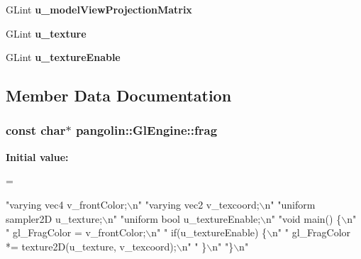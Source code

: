 \begin{DoxyCompactItemize}
\item 
G\+Lint {\bfseries u\+\_\+model\+View\+Projection\+Matrix}\hypertarget{classpangolin_1_1_gl_engine_ad2fc4ebbdb669ef755d7f9466776caaf}{}\label{classpangolin_1_1_gl_engine_ad2fc4ebbdb669ef755d7f9466776caaf}

\item 
G\+Lint {\bfseries u\+\_\+texture}\hypertarget{classpangolin_1_1_gl_engine_a93197b50d98df00bcee1acb99965b91a}{}\label{classpangolin_1_1_gl_engine_a93197b50d98df00bcee1acb99965b91a}

\item 
G\+Lint {\bfseries u\+\_\+texture\+Enable}\hypertarget{classpangolin_1_1_gl_engine_a00bc41a89fc34752eeed98e5ab12e071}{}\label{classpangolin_1_1_gl_engine_a00bc41a89fc34752eeed98e5ab12e071}

\end{DoxyCompactItemize}


\subsection{Member Data Documentation}
\subsubsection[{\texorpdfstring{frag}{frag}}]{\setlength{\rightskip}{0pt plus 5cm}const char$\ast$ pangolin\+::\+Gl\+Engine\+::frag}\hypertarget{classpangolin_1_1_gl_engine_a31a7ddec551f97901b4c2e32ea1b8c41}{}\label{classpangolin_1_1_gl_engine_a31a7ddec551f97901b4c2e32ea1b8c41}
{\bfseries Initial value\+:}
\begin{DoxyCode}
=


 
            \textcolor{stringliteral}{"varying vec4 v\_frontColor;\(\backslash\)n"}
            \textcolor{stringliteral}{"varying vec2 v\_texcoord;\(\backslash\)n"}
            \textcolor{stringliteral}{"uniform sampler2D u\_texture;\(\backslash\)n"}
            \textcolor{stringliteral}{"uniform bool u\_textureEnable;\(\backslash\)n"}
            \textcolor{stringliteral}{"void main() \{\(\backslash\)n"}
            \textcolor{stringliteral}{"  gl\_FragColor = v\_frontColor;\(\backslash\)n"}
            \textcolor{stringliteral}{"  if(u\_textureEnable) \{\(\backslash\)n"}
            \textcolor{stringliteral}{"    gl\_FragColor *= texture2D(u\_texture, v\_texcoord);\(\backslash\)n"}
            \textcolor{stringliteral}{"  \}\(\backslash\)n"}
            \textcolor{stringliteral}{"\}\(\backslash\)n"}
\end{DoxyCode}
